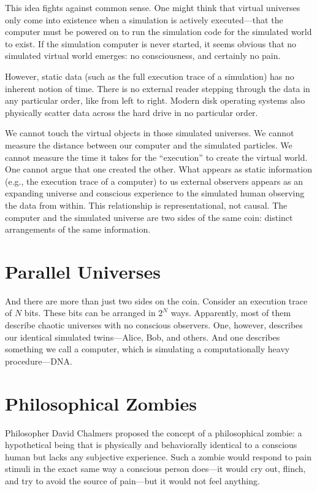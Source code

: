 This idea fights against common sense. One might think that virtual universes only come into existence when a simulation is actively executed—that the computer must be powered on to run the simulation code for the simulated world to exist.
If the simulation computer is never started, it seems obvious that no simulated virtual world emerges: no consciousness, and certainly no pain.

However, static data (such as the full execution trace of a simulation) has no inherent notion of time.
There is no external reader stepping through the data in any particular order, like from left to right.
Modern disk operating systems also physically scatter data across the hard drive in no particular order.

We cannot touch the virtual objects in those simulated universes.
We cannot measure the distance between our computer and the simulated particles.
We cannot measure the time it takes for the ``execution'' to create the virtual world.
One cannot argue that one created the other.
What appears as static information (e.g., the execution trace of a computer) to us external observers appears as an expanding universe and conscious experience to the simulated human observing the data from within.
This relationship is representational, not causal.
The computer and the simulated universe are two sides of the same coin: distinct arrangements of the same information.


\section{Parallel Universes}

And there are more than just two sides on the coin.
Consider an execution trace of $N$ bits. These bits can be arranged in $2^N$ ways.
Apparently, most of them describe chaotic universes with no conscious observers.
One, however, describes our identical simulated twins---Alice, Bob, and others. And one describes something we call a computer, which is simulating a computationally heavy procedure---DNA.


\section{Philosophical Zombies}

Philosopher David Chalmers \cite{chalmers1995facing} proposed the concept of a philosophical zombie: a hypothetical being that is physically and behaviorally identical to a conscious human but lacks any subjective experience.
Such a zombie would respond to pain stimuli in the exact same way a conscious person does---it would cry out, flinch, and try to avoid the source of pain---but it would not feel anything.

